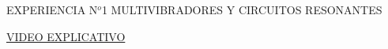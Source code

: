 \documentclass[12pt, a4paper]{article}
\begin{document}
\thispagestyle{titulo}
\begin{center}
{\large EXPERIENCIA N$^o$1 MULTIVIBRADORES Y CIRCUITOS RESONANTES}
\end{center}

{\Large \href{https://drive.google.com/drive/folders/1fvojh8YbbdQwtmJNgBLz1jIMM7Ws86qz?usp=sharing}{VIDEO EXPLICATIVO}}











\end{document}
